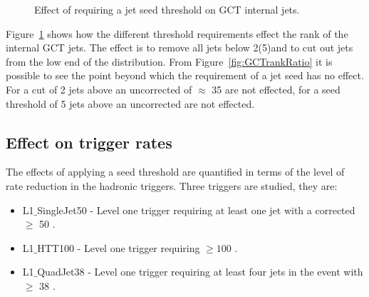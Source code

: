\begin{figure}[h!]
    \centering
    \caption{Effect of requiring a jet seed threshold on GCT internal jets.}
    \label{fig:GCTrank}
\end{figure}


Figure~\ref{fig:GCTrank} shows how the different threshold requirements effect 
the rank of the internal GCT jets. The effect is to remove all jets below 
2(5)\GeV and to cut out jets from the low end of the distribution. From 
Figure~\ref{fig:GCTrankRatio} it is possible to see the point beyond which the 
requirement of a jet seed has no effect. For a cut of 2 \GeV jets above an 
uncorrected \ET of $\approx$ 35 \GeV are not effected, for a seed threshold of 
5 \GeV jets above an uncorrected  \GeV are not effected.


\subsection{Effect on trigger rates} %
\label{sec:Effects on Rate}
The effects of applying a seed threshold are quantified in terms of the level of rate
reduction in the \Lone hadronic triggers.
Three triggers are studied, they are:
\begin{itemize}
  \item L1$\_$SingleJet50 - Level one trigger requiring at least one jet with a 
  corrected \ET $\geq$ 50 \GeV.
  \item L1$\_$HTT100 - Level one trigger requiring \HT $\geq 100$ \GeV.
  \item L1$\_$QuadJet38 - Level one trigger requiring at least four jets in the 
  event with \ET $\geq$ 38 \GeV.

\end{itemize}
